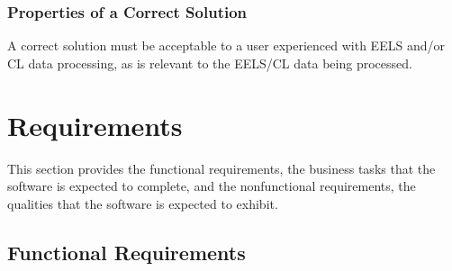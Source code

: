 \documentclass[12pt]{article}
\begin{document}
\subsubsection{Properties of a Correct Solution} \label{sec_CorrectSolution}

\noindent
A correct solution must be acceptable to a user experienced with EELS and/or CL data processing, as is relevant to the EELS/CL data being processed.

\section{Requirements}

This section provides the functional requirements, the business tasks that the
software is expected to complete, and the nonfunctional requirements, the
qualities that the software is expected to exhibit.

\subsection{Functional Requirements}
\end{document}
